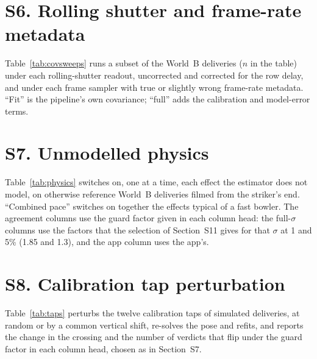 \documentclass[journal]{IEEEtran}
\begin{document}
\section*{S6. Rolling shutter and frame-rate metadata}

Table~\ref{tab:covsweeps} runs a subset of the World~B deliveries ($n$ in the table) under each rolling-shutter
readout, uncorrected and corrected for the row delay, and under each frame sampler with true or slightly
wrong frame-rate metadata. ``Fit'' is the pipeline's own covariance; ``full'' adds the calibration and model-error
terms.

\begin{table}[t]
\centering
\caption{Rolling-shutter readout and frame sampling on simulated World~B deliveries. Errors in mm; one-sigma
coverage in \%.}
\label{tab:covsweeps}
\scriptsize

\end{table}

\section*{S7. Unmodelled physics}

Table~\ref{tab:physics} switches on, one at a time, each effect the estimator does not model, on otherwise
reference World~B deliveries filmed from the striker's end. ``Combined pace'' switches on together the effects typical of a fast bowler.
The agreement columns use the guard factor given in each column head: the full-$\sigma$ columns use the
factors that the selection of Section~S11 gives for that $\sigma$ at 1 and 5\% (1.85 and 1.3), and the app
column uses the app's.

\begin{table}[t]
\centering
\caption{Influence of each unmodelled physical effect on the simulated stump-plane crossing. Errors in mm;
one-sigma coverage of the full uncertainty in \%; agreement with the true verdict in \%.}
\label{tab:physics}
\scriptsize
\setlength{\tabcolsep}{3pt}
\resizebox{\textwidth}{!}{}
\end{table}

\section*{S8. Calibration tap perturbation}

Table~\ref{tab:taps} perturbs the twelve calibration taps of simulated deliveries, at random or by a
common vertical shift, re-solves the pose and refits, and reports the change in the crossing and the
number of verdicts that flip under the guard factor in each column head, chosen as in Section~S7.
\end{document}
